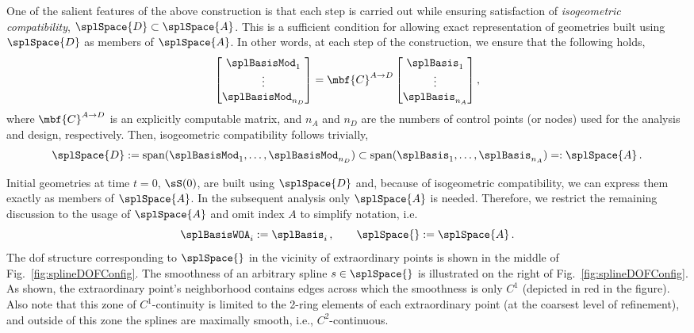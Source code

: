 \documentclass[11pt]{article}
\newcommand{\KKM}[1]{\textcolor{magenta}{[KKM:~#1]}}
\begin{document}
One of the salient features of the above construction is that each step is carried out while ensuring satisfaction of \emph{isogeometric compatibility}, $\splSpace{D} \subset \splSpace{A}$. 
This is a sufficient condition for allowing exact representation of geometries built using $\splSpace{D}$ as members of $\splSpace{A}$. In other words, at each step of the construction, we ensure that the following holds,
\begin{equation}
\begin{bmatrix}
\splBasisMod_1\\
\vdots\\
\splBasisMod_{n_D}
\end{bmatrix}
=
\mbf{C}^{A\rightarrow D}
\begin{bmatrix}
\splBasis_1\\
\vdots\\
\splBasis_{n_A}
\end{bmatrix},
\end{equation}
where $\mbf{C}^{A\rightarrow D}$ is an explicitly computable matrix, and $n_A$ and $n_D$ are the numbers of control points (or nodes) used for the analysis and design, respectively. Then, isogeometric compatibility follows trivially,
\begin{equation}
	\splSpace{D} := \text{span}(\splBasisMod_1,\dots,\splBasisMod_{n_D}) \subset \text{span}(\splBasis_1,\dots,\splBasis_{n_A}) =: \splSpace{A}\,.
\end{equation}

Initial geometries at time $t = 0$, $\sS(0)$, are built using $\splSpace{D}$ and, because of isogeometric compatibility, we can express them exactly as members of $\splSpace{A}$. 
In the subsequent analysis only $\splSpace{A}$ is needed. 
Therefore, %
we restrict the remaining discussion to
the usage of $\splSpace{A}$ and omit index $A$ to simplify notation, i.e.
\begin{equation}
	\splBasisWOA_i := \splBasis_i\,,\qquad\splSpace{} := \splSpace{A}\,.	
\end{equation}
The dof structure corresponding to $\splSpace{}$ in the vicinity of extraordinary points is shown in the middle of Fig.~\ref{fig:splineDOFConfig}. 
The smoothness of an arbitrary spline $s \in \splSpace{}$ is illustrated on the right of Fig.~\ref{fig:splineDOFConfig}. 
As shown, the extraordinary point's neighborhood contains edges across which the smoothness is only $C^1$ (depicted in red in the figure). Also note that this zone of $C^1$-continuity is limited to the 2-ring elements of each extraordinary point (at the coarsest level of refinement), and outside of this zone the splines are maximally smooth, i.e., $C^2$-continuous. 
\end{document}
